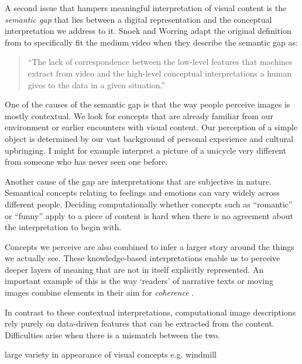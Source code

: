 A second issue that hampers meaningful interpretation of visual content is the \emph{semantic gap} that lies between a digital representation and the conceptual interpretation we address to it. Snoek and Worring adapt the original definition from \cite{Smeulders:2000tx} to specifically fit the medium video when they describe the semantic gap as:

\begin{quote}
  ``The lack of correspondence between the low-level features that machines extract from video and the high-level conceptual interpretations a human gives to the data in a given situation.''
\end{quote}

One of the causes of the semantic gap is that the way people perceive images is mostly contextual\cite{Smeulders:2000tx}. We look for concepts that are already familiar from our environment or earlier encounters with visual content. Our perception of a simple object is determined by our vast background of personal experience and cultural upbringing. I might for example interpret a picture of a unicycle very different from someone who has never seen one before.

Another cause of the gap are interpretations that are subjective in nature. Semantical concepts relating to feelings and emotions can vary widely across different people. Deciding computationally whether concepts such as ``romantic'' or ``funny'' apply to a piece of content is hard when there is no agreement about the interpretation to begin with.

Concepts we perceive are also combined to infer a larger story around the things we actually see. These knowledge-based interpretations enable us to perceive deeper layers of meaning that are not in itself explicitly represented. An important example of this is the way `readers' of narrative texts or moving images combine elements in their aim for \emph{coherence}\cite[p.~38]{Bordwell:1985tz} \cite{gernsbacher1995coherence, Graesser:1994va}. 

In contrast to these contextual interpretations, computational image descriptions rely purely on data-driven features that can be extracted from the content. Difficulties arise when there is a mismatch between the two.

large variety in appearance of visual concepts
e.g. windmill

